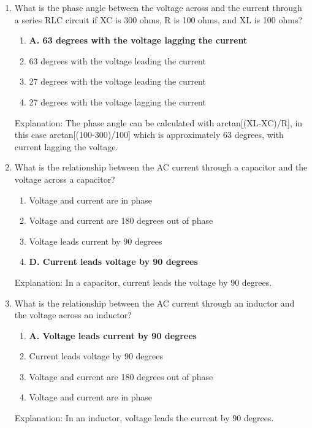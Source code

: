 \begin{enumerate}
      \item What is the phase angle between the voltage across and the current through a series RLC circuit if XC is 300 ohms, R is 100 ohms, and XL is 100 ohms?
       \begin{enumerate}
       \item \textbf{A. 63 degrees with the voltage lagging the current}
         \item  63 degrees with the voltage leading the current
        \item  27 degrees with the voltage leading the current
      \item  27 degrees with the voltage lagging the current
        \end{enumerate}
        \textcolor{myred}{Explanation:}
          The phase angle can be calculated with arctan[(XL-XC)/R], in this case arctan[(100-300)/100] which is approximately 63 degrees, with current lagging the voltage.

    \item What is the relationship between the AC current through a capacitor and the voltage across a capacitor?
       \begin{enumerate}
      \item  Voltage and current are in phase
       \item  Voltage and current are 180 degrees out of phase
      \item  Voltage leads current by 90 degrees
      \item \textbf{D. Current leads voltage by 90 degrees}
     \end{enumerate}
     \textcolor{myred}{Explanation:}
    In a capacitor, current leads the voltage by 90 degrees.
      
      \item What is the relationship between the AC current through an inductor and the voltage across an inductor?
       \begin{enumerate}
         \item \textbf{A. Voltage leads current by 90 degrees}
         \item  Current leads voltage by 90 degrees
        \item  Voltage and current are 180 degrees out of phase
      \item  Voltage and current are in phase
        \end{enumerate}
    \textcolor{myred}{Explanation:}
     In an inductor, voltage leads the current by 90 degrees.


\end{enumerate}
